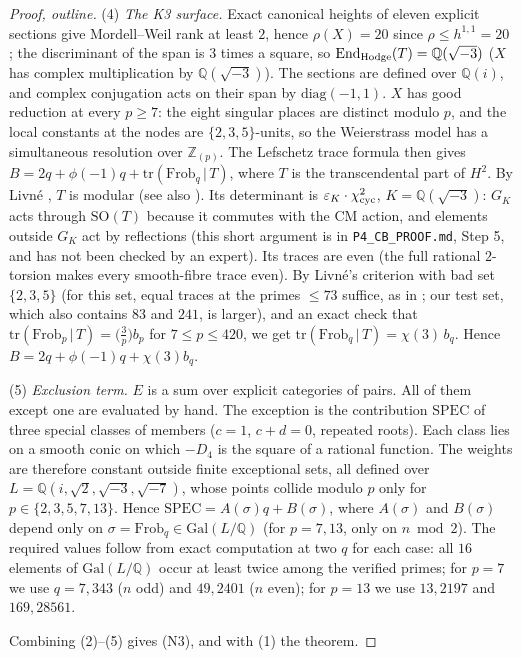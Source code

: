 \documentclass[11pt]{article}
\begin{document}
\begin{proof}[Proof, outline]
(4) \emph{The K3 surface.} Exact canonical heights of eleven explicit sections \cite{Shi} give Mordell--Weil rank at least $2$, hence $\rho(X)=20$ since $\rho\le h^{1,1}=20$; the discriminant of the span is $3$ times a square, so $\mathrm{End}_{\rm Hodge}(T)=\mathbb Q(\sqrt{-3})$ ($X$ has complex multiplication by $\mathbb Q(\sqrt{-3})$). The sections are defined over $\mathbb Q(i)$, and complex conjugation acts on their span by $\mathrm{diag}(-1,1)$.
$X$ has good reduction at every $p\ge7$: the eight singular places are distinct modulo $p$, and the local constants at the nodes are $\{2,3,5\}$-units, so the Weierstrass model has a simultaneous resolution over $\mathbb Z_{(p)}$.
The Lefschetz trace formula then gives $B=2q+\phi(-1)q+\mathrm{tr}(\mathrm{Frob}_q\,|\,T)$, where $T$ is the transcendental part of $H^2$. By Livn\'e \cite{Li95}, $T$ is modular (see also \cite{Sch09}). Its determinant is $\varepsilon_K\cdot\chi_{\rm cyc}^2$, $K=\mathbb Q(\sqrt{-3})$: $G_K$ acts through $\mathrm{SO}(T)$ because it commutes with the CM action, and elements outside $G_K$ act by reflections (this short argument is in \texttt{P4\_CB\_PROOF.md}, Step 5, and has not been checked by an expert). Its traces are even (the full rational $2$-torsion makes every smooth-fibre trace even).
By Livn\'e's criterion \cite[Thm.~4.3 and Prop.~4.11]{Li87} with bad set $\{2,3,5\}$ (for this set, equal traces at the primes $\le73$ suffice, as in \cite[\S2.7--2.8]{Sch12}; our test set, which also contains $83$ and $241$, is larger), and an exact check that $\mathrm{tr}(\mathrm{Frob}_p\,|\,T)=\bigl(\tfrac3p\bigr)b_p$ for $7\le p\le420$, we get $\mathrm{tr}(\mathrm{Frob}_q\,|\,T)=\chi(3)\,b_q$. Hence $B=2q+\phi(-1)q+\chi(3)b_q$.

(5) \emph{Exclusion term.} $E$ is a sum over explicit categories of pairs. All of them except one are evaluated by hand. The exception is the contribution $\mathrm{SPEC}$ of three special classes of members ($c=1$, $c+d=0$, repeated roots). Each class lies on a smooth conic on which $-D_4$ is the square of a rational function. The weights are therefore constant outside finite exceptional sets, all defined over $L=\mathbb Q(i,\sqrt2,\sqrt{-3},\sqrt{-7})$, whose points collide modulo $p$ only for $p\in\{2,3,5,7,13\}$.
Hence $\mathrm{SPEC}=A(\sigma)q+B(\sigma)$, where $A(\sigma)$ and $B(\sigma)$ depend only on $\sigma=\mathrm{Frob}_q\in\mathrm{Gal}(L/\mathbb Q)$ (for $p=7,13$, only on $n\bmod2$). The required values follow from exact computation at two $q$ for each case: all $16$ elements of $\mathrm{Gal}(L/\mathbb Q)$ occur at least twice among the verified primes; for $p=7$ we use $q=7,343$ ($n$ odd) and $49,2401$ ($n$ even); for $p=13$ we use $13,2197$ and $169,28561$.

Combining (2)--(5) gives (N3), and with (1) the theorem.
\end{proof}
\end{document}

